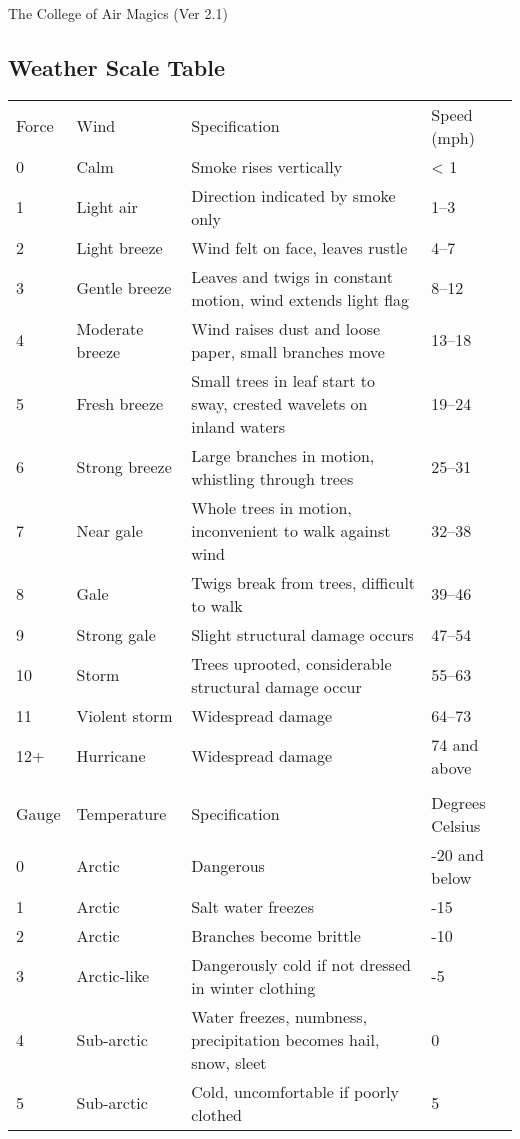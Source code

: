 \begin{Chapter}{The College of Air Magics (Ver 2.1)}
\begin{table*}
\section{Weather Scale Table}
\begin{tabularx}{\linewidth}{llXl}
Force 		& Wind 			& Specification 							& Speed (mph) \\
0 		& Calm 			& Smoke rises vertically 						& < 1 \\
1 		& Light air 		& Direction indicated by smoke only 					& 1–3 \\
2 		& Light breeze 		& Wind felt on face, leaves rustle 					& 4–7 \\
3 		& Gentle breeze		& Leaves and twigs in constant motion, wind extends light flag 		& 8–12 \\
4		& Moderate breeze 	& Wind raises dust and loose paper, small branches move 		& 13–18 \\
5		& Fresh breeze 		& Small trees in leaf start to sway, crested wavelets on inland waters 	& 19–24 \\
6 		& Strong breeze 	& Large branches in motion, whistling through trees 			& 25–31 \\
7 		& Near gale 		& Whole trees in motion, inconvenient to walk against wind 		& 32–38 \\
8 		& Gale 			& Twigs break from trees, difficult to walk 				& 39–46 \\
9 		& Strong gale 		& Slight structural damage occurs 					& 47–54 \\
10 		& Storm 		& Trees uprooted, considerable structural damage occur 			& 55–63 \\
11 		& Violent storm 	& Widespread damage				 			& 64–73 \\
12+ 		& Hurricane 		& Widespread damage 							& 74 and above \\
\\
Gauge 		& Temperature 		& Specification								& Degrees Celsius \\
0 		& Arctic 		& Dangerous								& -20 and below \\
1 		& Arctic 		& Salt water freezes							& -15 \\
2 		& Arctic 		& Branches become brittle						& -10 \\
3 		& Arctic-like 		& Dangerously cold if not dressed in winter clothing			& -5 \\
4 		& Sub-arctic 		& Water freezes, numbness, precipitation becomes hail, snow, sleet	& 0 \\
5 		& Sub-arctic 		& Cold, uncomfortable if poorly clothed					& 5 \\ 

\end{tabularx}
\end{table*}
\end{Chapter}
